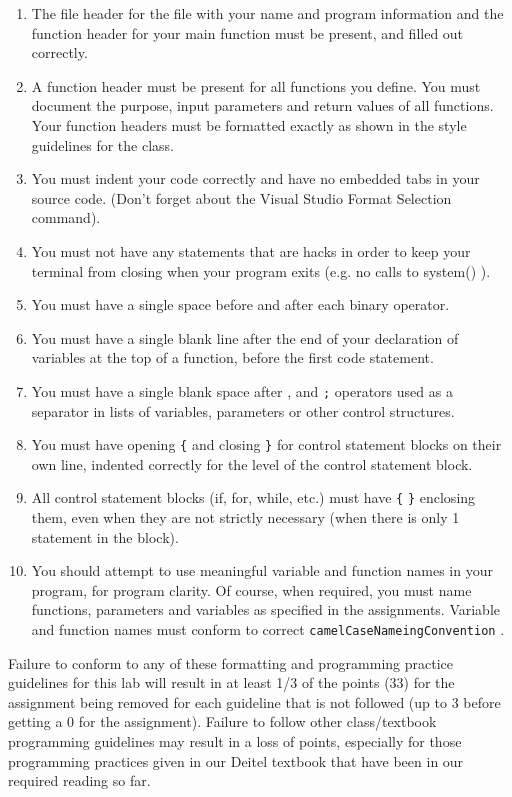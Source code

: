 \documentclass[11pt]{article}
\begin{document}
\begin{enumerate}
\item The file header for the file with your name and program information
and the function header for your main function must be present, and
filled out correctly.
\item A function header must be present for all functions you define.
You must document the purpose, input parameters and return values
of all functions.  Your function headers must be formatted exactly
as shown in the style guidelines for the class.
\item You must indent your code correctly and have no embedded tabs in
your source code. (Don't forget about the Visual Studio Format
Selection command).
\item You must not have any statements that are hacks in order to keep
your terminal from closing when your program exits (e.g. no calls
to system() ).
\item You must have a single space before and after each binary operator.
\item You must have a single blank line after the end of your declaration
of variables at the top of a function, before the first code
statement.
\item You must have a single blank space after , and \verb~;~ operators used as a
separator in lists of variables, parameters or other control
structures.
\item You must have opening \verb~{~ and closing \verb~}~ for control statement blocks
on their own line, indented correctly for the level of the control
statement block.
\item All control statement blocks (if, for, while, etc.) must have \verb~{~
\verb~}~ enclosing them, even when they are not strictly necessary
(when there is only 1 statement in the block).
\item You should attempt to use meaningful variable and function names in
your program, for program clarity.  Of course, when required, you
must name functions, parameters and variables as specified in the
assignments.  Variable and function names must conform to correct
\verb~camelCaseNameingConvention~ .
\end{enumerate}

Failure to conform to any of these formatting and programming practice
guidelines for this lab will result in at least 1/3 of the points (33)
for the assignment being removed for each guideline that is not
followed (up to 3 before getting a 0 for the assignment). Failure to
follow other class/textbook programming guidelines may result in a
loss of points, especially for those programming practices given in
our Deitel textbook that have been in our required reading so far.
\end{document}
